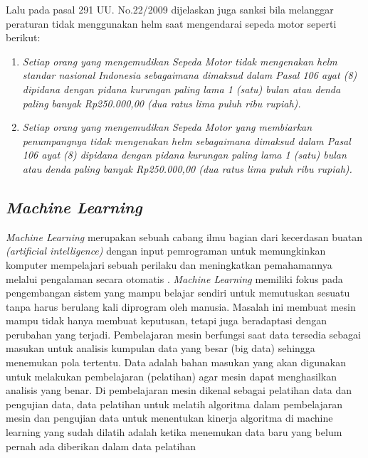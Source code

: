 Lalu pada pasal 291 UU. No.22/2009 dijelaskan juga sanksi bila melanggar peraturan tidak menggunakan
helm saat mengendarai sepeda motor seperti berikut:
\begin{enumerate}
  \item \emph{Setiap orang yang mengemudikan Sepeda Motor tidak
  mengenakan helm standar nasional Indonesia
  sebagaimana dimaksud dalam Pasal 106 ayat (8)
  dipidana dengan pidana kurungan paling lama 1 (satu)
  bulan atau denda paling banyak Rp250.000,00 (dua
  ratus lima puluh ribu rupiah).} 
  \item \emph{Setiap orang yang mengemudikan Sepeda Motor yang
  membiarkan penumpangnya tidak mengenakan helm
  sebagaimana dimaksud dalam Pasal 106 ayat (8)
  dipidana dengan pidana kurungan paling lama 1 (satu)
  bulan atau denda paling banyak Rp250.000,00 (dua
  ratus lima puluh ribu rupiah).}
\end{enumerate}
 


\subsection{\emph{Machine Learning}}
\label{sec:machinelearning}

\emph{Machine Learning} merupakan sebuah cabang ilmu bagian dari kecerdasan buatan \emph{(artificial intelligence)}
dengan input pemrograman untuk memungkinkan komputer mempelajari sebuah perilaku dan meningkatkan
pemahamannya melalui pengalaman secara otomatis \citep{machinelearning}. \emph{Machine Learning} memiliki fokus pada pengembangan sistem yang mampu belajar
sendiri untuk memutuskan sesuatu tanpa harus berulang kali diprogram oleh manusia. Masalah ini
membuat mesin mampu tidak hanya membuat keputusan, tetapi juga
beradaptasi dengan perubahan yang terjadi. Pembelajaran mesin berfungsi saat data tersedia
sebagai masukan untuk analisis kumpulan data yang besar (big data) sehingga
menemukan pola tertentu. Data adalah bahan masukan yang akan digunakan untuk melakukan
pembelajaran (pelatihan) agar mesin dapat menghasilkan analisis yang benar. Di
pembelajaran mesin dikenal sebagai pelatihan data dan pengujian data, data pelatihan untuk melatih algoritma
dalam pembelajaran mesin dan pengujian data untuk menentukan kinerja algoritma di
machine learning yang sudah dilatih adalah ketika menemukan data baru yang belum pernah ada
diberikan dalam data pelatihan \citep{machinelearning2}

